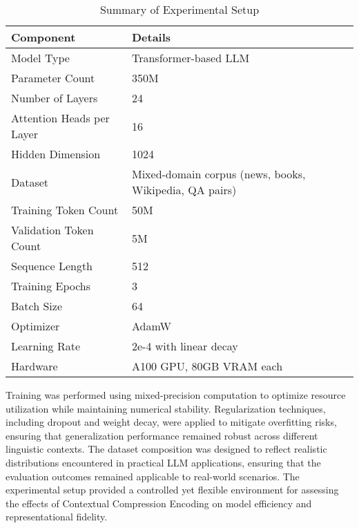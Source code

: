 \documentclass{article}
\begin{document}
\begin{table}[t]
	\centering
	\caption{Summary of Experimental Setup}
	\label{tab:experiment_setup}
		\begin{tabular}{ll}
			\hline
			\textbf{Component} & \textbf{Details} \\
			\hline
			Model Type & Transformer-based LLM \\
			
			Parameter Count & 350M \\
			
			Number of Layers & 24 \\
			
			Attention Heads per Layer & 16 \\
			
			Hidden Dimension & 1024 \\
			
			Dataset & Mixed-domain corpus (news, books, Wikipedia, QA pairs) \\
			
			Training Token Count & 50M \\
			
			Validation Token Count & 5M \\
			
			Sequence Length & 512 \\
			
			Training Epochs & 3 \\
			
			Batch Size & 64 \\
			
			Optimizer & AdamW \\
			
			Learning Rate & 2e-4 with linear decay \\
			
			Hardware &  A100 GPU, 80GB VRAM each \\
			\hline
		\end{tabular}%
\end{table}

Training was performed using mixed-precision computation to optimize resource utilization while maintaining numerical stability. Regularization techniques, including dropout and weight decay, were applied to mitigate overfitting risks, ensuring that generalization performance remained robust across different linguistic contexts. The dataset composition was designed to reflect realistic distributions encountered in practical LLM applications, ensuring that the evaluation outcomes remained applicable to real-world scenarios. The experimental setup provided a controlled yet flexible environment for assessing the effects of Contextual Compression Encoding on model efficiency and representational fidelity.
\end{document}
